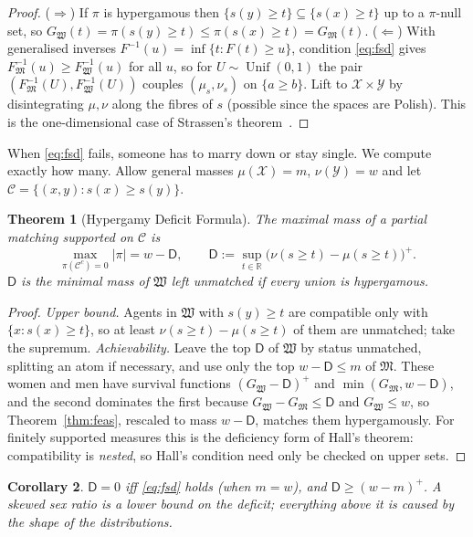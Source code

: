 \documentclass[11pt]{article}
\newtheorem{theorem}{Theorem}[section]
\newtheorem{corollary}[theorem]{Corollary}
\theoremstyle{definition}
\theoremstyle{remark}
\newcommand{\M}{\mathfrak{M}}
\newcommand{\W}{\mathfrak{W}}
\newcommand{\X}{\mathcal{X}}
\newcommand{\Y}{\mathcal{Y}}
\newcommand{\C}{\mathcal{C}}
\newcommand{\R}{\mathbb{R}}
\newcommand{\D}{\mathsf{D}}
\DeclareMathOperator{\Unif}{Unif}
\begin{document}
\begin{proof}
  ($\Rightarrow$) If $\pi$ is hypergamous then $\{s(y)\ge
  t\}\subseteq\{s(x)\ge t\}$ up to a $\pi$-null set, so $G_\W(t) =
  \pi(s(y)\ge t) \le \pi(s(x)\ge t) = G_\M(t)$. ($\Leftarrow$) With
  generalised inverses $F^{-1}(u) = \inf\{t : F(t)\ge u\}$, condition
  \eqref{eq:fsd} gives $F_\M^{-1}(u)\ge F_\W^{-1}(u)$ for all $u$, so
  for $U\sim\Unif(0,1)$ the pair $(F_\M^{-1}(U), F_\W^{-1}(U))$
  couples $(\mu_s,\nu_s)$ on $\{a\ge b\}$. Lift to $\X\times\Y$ by
  disintegrating $\mu,\nu$ along the fibres of $s$ (possible since
  the spaces are Polish). This is the one-dimensional case of
  Strassen's theorem~\cite{strassen}.
\end{proof}

When \eqref{eq:fsd} fails, someone has to marry down or stay single.
We compute exactly how many. Allow general masses $\mu(\X) = m$,
$\nu(\Y) = w$ and let $\C = \{(x,y) : s(x)\ge s(y)\}$.

\begin{theorem}[Hypergamy Deficit Formula]\label{thm:deficit}
  The maximal mass of a partial matching supported on $\C$ is
  \begin{equation}
    \max_{\pi(\C^c)=0} |\pi| = w - \D, \qquad \D := \sup_{t\in\R}
    \bigl(\nu(s\ge t) - \mu(s\ge t)\bigr)^+.
  \end{equation}
  $\D$ is the minimal mass of $\W$ left unmatched if every union is hypergamous.
\end{theorem}

\begin{proof}
  \emph{Upper bound.} Agents in $\W$ with $s(y)\ge t$ are compatible
  only with $\{x : s(x)\ge t\}$, so at least $\nu(s\ge t) - \mu(s\ge
  t)$ of them are unmatched; take the supremum. \emph{Achievability.}
  Leave the top $\D$ of $\W$ by status unmatched, splitting an atom if
  necessary, and use only the top $w-\D\le m$ of $\M$. These women and
  men have survival functions $(G_\W-\D)^+$ and $\min(G_\M,w-\D)$, and
  the second dominates the first because $G_\W-G_\M\le\D$ and
  $G_\W\le w$, so Theorem~\ref{thm:feas}, rescaled to mass $w-\D$,
  matches them hypergamously. For finitely supported measures this is
  the deficiency form of Hall's theorem: compatibility is
  \emph{nested}, so Hall's condition need only be checked on upper
  sets.
\end{proof}

\begin{corollary}
  $\D = 0$ iff \eqref{eq:fsd} holds (when $m = w$), and
  $\D\ge(w-m)^+$. A skewed sex ratio is a lower bound on the deficit;
  everything above it is caused by the shape of the distributions.
\end{corollary}
\end{document}
